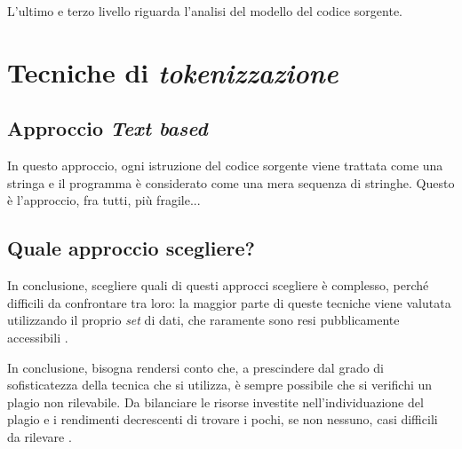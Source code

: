 L'ultimo e terzo livello riguarda l'analisi del modello del codice sorgente.

\section{Tecniche di \textit{tokenizzazione}}

\subsection{Approccio \textit{Text based}}
In questo approccio, ogni istruzione del codice sorgente viene trattata come una stringa e il programma è considerato come una mera sequenza di stringhe.
%
Questo è l'approccio, fra tutti, più fragile...

\subsection{}

\subsection{}

\subsection{Quale approccio scegliere?}
In conclusione, scegliere quali di questi approcci scegliere è complesso, perché difficili da confrontare tra loro: la maggior parte di queste tecniche viene valutata utilizzando il proprio \textit{set} di dati, che raramente sono resi pubblicamente accessibili \cite{karnalim-budi-toba-joy-2019}.

In conclusione, bisogna rendersi conto che, a prescindere dal grado di sofisticatezza della tecnica che si utilizza, è sempre possibile che si verifichi un plagio non rilevabile.
%
Da bilanciare le risorse investite nell'individuazione del plagio e i rendimenti decrescenti di trovare i pochi, se non nessuno, casi difficili da rilevare \cite{joy-99}.


